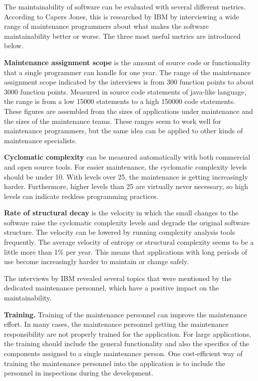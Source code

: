 The maintainability of software can be evaluated with several different metrics. According to Capers Jones, this is researched by IBM by interviewing a wide range of maintenance programmers about what makes the software maintainability better or worse. The three most useful metrics are introduced below.

\textbf{Maintenance assignment scope} is the amount of source code or functionality that a single programmer can handle for one year. The range of the maintenance assignment scope indicated by the interviews is from 300 function points to about 3000 function points. Measured in source code statements of java-like language, the range is from a low 15000 statements to a high 150000 code statements. These figures are assembled from the sizes of applications under maintenance and the sizes of the maintenance teams. These ranges seem to work well for maintenance programmers, but the same idea can be applied to other kinds of maintenance specialists.

\textbf{Cyclomatic complexity} can be measured automatically with both commercial and open source tools. For easier maintenance, the cyclomatic complexity levels should be under 10. With levels over 25, the maintenance is getting increasingly harder. Furthermore, higher levels than 25 are virtually never necessary, so high levels can indicate reckless programming practices.

\textbf{Rate of structural decay} is the velocity in which the small changes to the software raise the cyclomatic complexity levels and degrade the original software structure. The velocity can be lowered by running complexity analysis tools frequently. The average velocity of entropy or structural complexity seems to be a little more than 1\% per year. This means that applications with long periods of use become increasingly harder to maintain or change safely.

The interviews by IBM revealed several topics that were mentioned by the dedicated maintenance personnel, which have a positive impact on the maintainability.

\textbf{Training.} Training of the maintenance personnel can improve the maintenance effort. In many cases, the maintenance personnel getting the maintenance responsibility are not properly trained for the application. For large applications, the training should include the general functionality and also the specifics of the components assigned to a single maintenance person. One cost-efficient way of training the maintenance personnel into the application is to include the personnel in inspections during the development.

